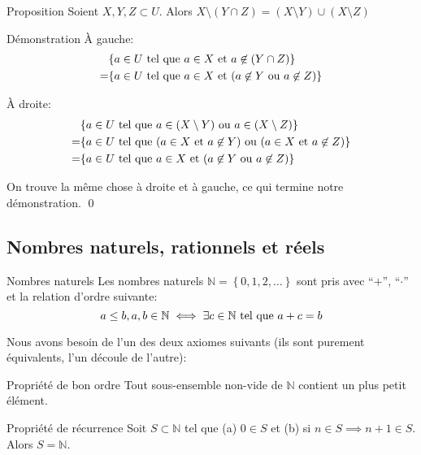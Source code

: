 \documentclass{article}
\begin{document}
\begin{parag}{Proposition}
    Soient $X, Y, Z \subset U$. Alors $X \setminus \left(Y \cap Z\right) = \left(X \setminus Y\right) \cup \left(X \setminus Z\right)$

    \begin{subparag}{Démonstration}
        À gauche:
        \[\begin{split}
        & \left\{a \in U \telque a \in X \text{ et } a \not\in \left(Y \cap Z\right)\right\} \\
        = & \left\{a \in U \telque a \in X \text{ et } \left(a \not\in Y \text{ ou } a \not\in Z\right)\right\}
        \end{split}\]

        À droite:
        \[\begin{split}
        & \left\{a \in U \telque a \in \left(X \setminus Y\right) \text{ ou } a \in \left(X \setminus Z\right)\right\} \\
        = & \left\{a \in U \telque \left(a \in X \text{ et } a \not\in Y\right) \text{ ou } \left(a \in X \text{ et } a \not\in Z\right)\right\} \\
        = & \left\{a \in U \telque a \in X \text{ et } \left(a \not\in Y \text{ ou } a \not\in Z\right)\right\}
        \end{split}\]

        On trouve la même chose à droite et à gauche, ce qui termine notre démonstration.
        \qed
    \end{subparag}

\end{parag}

\subsection{Nombres naturels, rationnels et réels}
\begin{parag}{Nombres naturels}
    Les nombres naturels $\mathbb{N} = \left\{0, 1, 2, \ldots\right\}$ sont pris avec ``$+$'', ``$\cdot$'' et la relation d'ordre suivante:
    \[a \leq b, a, b \in \mathbb{N} \iff \exists c \in \mathbb{N} \text{ tel que } a + c = b\]

    Nous avons besoin de l'un des deux axiomes suivants (ils sont purement équivalents, l'un découle de l'autre):

    \begin{subparag}{Propriété de bon ordre}
        Tout sous-ensemble non-vide de $\mathbb{N}$ contient un plus petit élément.
    \end{subparag}

    \begin{subparag}{Propriété de récurrence}
        Soit $S \subset \mathbb{N}$ tel que (a) $0 \in S$ et (b) si $n \in S \implies n + 1 \in S$. Alors $S = \mathbb{N}$.
    \end{subparag}
\end{parag}
\end{document}
